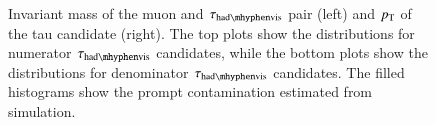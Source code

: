\begin{figure}[htbp]
{	}
	\hfill
\caption{\label{fig:taufakeprompt} Invariant mass of the muon and $\tauhadvis$ pair (left) and
  $p_{\text{T}}$ of the tau candidate (right). The top plots show the distributions for numerator $\tauhadvis$ candidates, while the bottom plots show the distributions for denominator $\tauhadvis$ candidates. The filled histograms show the prompt contamination estimated from simulation.}
\end{figure}

